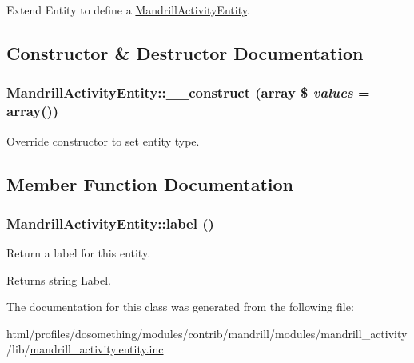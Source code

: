 Extend Entity to define a \hyperlink{classMandrillActivityEntity}{MandrillActivityEntity}. 

\subsection{Constructor \& Destructor Documentation}
\hypertarget{classMandrillActivityEntity_a4b874437ce13adf33df3a3b91213aa9c}{
\subsubsection[{\_\-\_\-construct}]{\setlength{\rightskip}{0pt plus 5cm}MandrillActivityEntity::\_\-\_\-construct (array \$ {\em values} = {\ttfamily array()})}}
\label{classMandrillActivityEntity_a4b874437ce13adf33df3a3b91213aa9c}
Override constructor to set entity type. 

\subsection{Member Function Documentation}
\hypertarget{classMandrillActivityEntity_a9c2c391203d8a77f91e3de71dff0650b}{
\subsubsection[{label}]{\setlength{\rightskip}{0pt plus 5cm}MandrillActivityEntity::label ()}}
\label{classMandrillActivityEntity_a9c2c391203d8a77f91e3de71dff0650b}
Return a label for this entity.

\begin{DoxyReturn}{Returns}
string Label. 
\end{DoxyReturn}


The documentation for this class was generated from the following file:\begin{DoxyCompactItemize}
\item 
html/profiles/dosomething/modules/contrib/mandrill/modules/mandrill\_\-activity/lib/\hyperlink{mandrill__activity_8entity_8inc}{mandrill\_\-activity.entity.inc}\end{DoxyCompactItemize}
